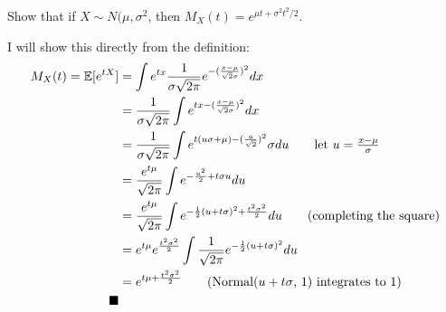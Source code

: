 Show that if $X \sim N(\mu, \sigma^2$, then $M_{X}(t) = e^{\mu t +\sigma^2 t^2/2}$.

I will show this directly from the definition:
\begin{align*}
    M_{X}(t) = \expec{e^{tX}} &= \int e^{tx}\frac{1}{\sigma\sqrt{2\pi}}e^{-(\frac{x-\mu}{\sqrt{2}\sigma})^2}dx\\
            &= \frac{1}{\sigma\sqrt{2\pi}}\int e^{tx-(\frac{x-\mu}{\sqrt{2}\sigma})^2}dx\\
            &= \frac{1}{\sigma\sqrt{2\pi}}\int e^{t(u\sigma+\mu)-(\frac{u}{\sqrt{2}})^2}\sigma du \tag*{let $u = \frac{x-\mu}{\sigma}$}\\
            &= \frac{e^{t\mu}}{\sqrt{2\pi}}\int e^{-\frac{u^2}{2}+t\sigma u} du \\
            &= \frac{e^{t\mu}}{\sqrt{2\pi}}\int e^{-\frac{1}{2}(u+t\sigma)^2+\frac{t^2\sigma^2}{2}} du \tag*{(completing the square)}\\
            &= e^{t\mu}e^{\frac{t^2\sigma^2}{2}}\int\frac{1}{\sqrt{2\pi}} e^{-\frac{1}{2}(u+t\sigma)^2} du \\
            &= e^{t\mu+\frac{t^2\sigma^2}{2}} \tag*{(Normal($u+t\sigma$, 1) integrates to 1)}\\
            \blacksquare
\end{align*}


